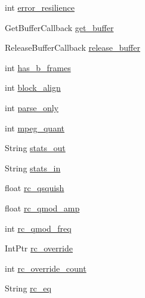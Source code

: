 \begin{DoxyCompactItemize}
int \hyperlink{struct_tao_1_1_f_fmpeg_1_1_f_fmpeg_1_1_a_v_codec_context_a30533ba356fcacc60d1b9e223c848254}{error\_\-resilience}
\item 
GetBufferCallback \hyperlink{struct_tao_1_1_f_fmpeg_1_1_f_fmpeg_1_1_a_v_codec_context_a48cbd8569687391bccaedb762db94404}{get\_\-buffer}
\item 
ReleaseBufferCallback \hyperlink{struct_tao_1_1_f_fmpeg_1_1_f_fmpeg_1_1_a_v_codec_context_adcd2bc41718cc8d7ecfb0cb369b34a6a}{release\_\-buffer}
\item 
int \hyperlink{struct_tao_1_1_f_fmpeg_1_1_f_fmpeg_1_1_a_v_codec_context_a86d13d659f35c24e8a1f8629fa726223}{has\_\-b\_\-frames}
\item 
int \hyperlink{struct_tao_1_1_f_fmpeg_1_1_f_fmpeg_1_1_a_v_codec_context_a238a87a1e941c7ab6f0a3922b88bbace}{block\_\-align}
\item 
int \hyperlink{struct_tao_1_1_f_fmpeg_1_1_f_fmpeg_1_1_a_v_codec_context_abcb480adf398e4ecec0336c4d9328eb3}{parse\_\-only}
\item 
int \hyperlink{struct_tao_1_1_f_fmpeg_1_1_f_fmpeg_1_1_a_v_codec_context_a9a7a1ee0c39ad4c2b4c225c8bdad582c}{mpeg\_\-quant}
\item 
String \hyperlink{struct_tao_1_1_f_fmpeg_1_1_f_fmpeg_1_1_a_v_codec_context_aa9da226c79ccd9789f95d10ff89bc267}{stats\_\-out}
\item 
String \hyperlink{struct_tao_1_1_f_fmpeg_1_1_f_fmpeg_1_1_a_v_codec_context_aaf9de8090723cecdf642165d7a1ac6fe}{stats\_\-in}
\item 
float \hyperlink{struct_tao_1_1_f_fmpeg_1_1_f_fmpeg_1_1_a_v_codec_context_a45d343fab3d8facbd6faa48e4cc6c125}{rc\_\-qsquish}
\item 
float \hyperlink{struct_tao_1_1_f_fmpeg_1_1_f_fmpeg_1_1_a_v_codec_context_acbf98a0cc442069d2f45ec704eacd08f}{rc\_\-qmod\_\-amp}
\item 
int \hyperlink{struct_tao_1_1_f_fmpeg_1_1_f_fmpeg_1_1_a_v_codec_context_a11e80e40d61d202378b6140df53598f8}{rc\_\-qmod\_\-freq}
\item 
IntPtr \hyperlink{struct_tao_1_1_f_fmpeg_1_1_f_fmpeg_1_1_a_v_codec_context_a3c76f1e9458cdafec9cf159f51453cf7}{rc\_\-override}
\item 
int \hyperlink{struct_tao_1_1_f_fmpeg_1_1_f_fmpeg_1_1_a_v_codec_context_a22140a41f483ef0f552f872fb9ee644c}{rc\_\-override\_\-count}
\item 
String \hyperlink{struct_tao_1_1_f_fmpeg_1_1_f_fmpeg_1_1_a_v_codec_context_a1ff8b28c9ac40826db2c434b7465352b}{rc\_\-eq}
\item 

\end{DoxyCompactItemize}
